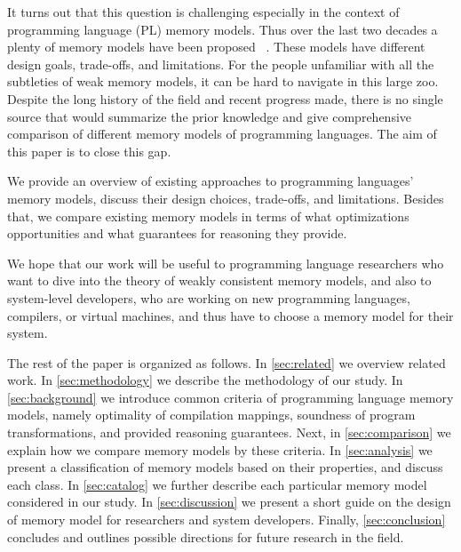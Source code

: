 It turns out that this question is challenging
especially in the context of programming language (PL) memory models.
Thus over the last two decades a plenty of memory models have been proposed~%
\cite{Manson-al:POPL05, Marino-al:PLDI10, Demange-al:POPL13, 
Batty-al:POPL11, Lahav-al:PLDI17, Dolan-al:PLDI18, Alglave-al:ASPLOS18, Watt-al:PLDI2020, 
Crary-Sullivan:POPL15, Zhang-Feng:FCS16, Jeffrey-Riely:LICS16, PichonPharabod-Sewell:POPL16, 
Kang-al:POPL17, Chakraborty-Vafeiadis:POPL19, Paviotti-al:ESOP20}. 
These models have different design goals, trade-offs, and limitations.
For the people unfamiliar with all the subtleties 
of weak memory models, it can be hard to navigate in this large zoo.
Despite the long history of the field and recent progress made, 
there is no single source that would summarize the prior knowledge
and give comprehensive comparison of different memory models
of programming languages. The aim of this paper is to close this gap.

We provide an overview of existing approaches to 
programming languages' memory models,
discuss their design choices, trade-offs, and limitations.
Besides that, we compare existing memory models 
in terms of what optimizations opportunities 
and what guarantees for reasoning they provide.

We hope that our work will be useful to programming language researchers 
who want to dive into the theory of weakly consistent memory models,
and also to system-level developers, 
who are working on new programming languages, compilers, or virtual machines, 
and thus have to choose a memory model for their system.

The rest of the paper is organized as follows.
In \cref{sec:related} we overview related work. 
In \cref{sec:methodology} we describe the methodology 
of our study. In \cref{sec:background} we 
introduce common criteria of programming language memory models,
namely optimality of compilation mappings, 
soundness of program transformations, 
and provided reasoning guarantees.
Next, in \cref{sec:comparison} we explain 
how we compare memory models by these criteria.
In \cref{sec:analysis} we present a classification
of memory models based on their properties, 
and discuss each class. 
In \cref{sec:catalog} we further describe 
each particular memory model considered in our study.
In \cref{sec:discussion} we present a short guide 
on the design of memory model for researchers and system developers.
Finally, \cref{sec:conclusion} concludes 
and outlines possible directions for future research in the field. 
